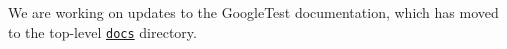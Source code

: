 We are working on updates to the Google\+Test documentation, which has moved to the top-\/level \href{../../docs}{\tt docs} directory. 